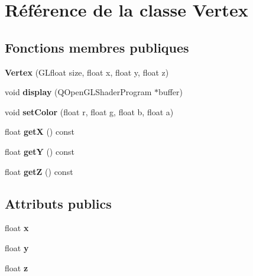 \hypertarget{classVertex}{}\section{Référence de la classe Vertex}
\label{classVertex}
\subsection*{Fonctions membres publiques}
\begin{DoxyCompactItemize}
\item 
\mbox{\label{classVertex_abf50078add37f9aa0561aee1df7d7b61}} 
{\bfseries Vertex} (G\+Lfloat size, float x, float y, float z)
\item 
\mbox{\label{classVertex_a1952c404463115f7d5f8bc34969460b1}} 
void {\bfseries display} (Q\+Open\+G\+L\+Shader\+Program $\ast$buffer)
\item 
\mbox{\label{classVertex_a2b3a815d2398fc189b672cf20b80c315}} 
void {\bfseries set\+Color} (float r, float g, float b, float a)
\item 
\mbox{\label{classVertex_a85b810eda5388be6c25f10637912d3bb}} 
float {\bfseries getX} () const
\item 
\mbox{\label{classVertex_a0e32c2b9f10f7cc2b6f94294772927a1}} 
float {\bfseries getY} () const
\item 
\mbox{\label{classVertex_a5da490f9713243943d516535d53a271f}} 
float {\bfseries getZ} () const
\end{DoxyCompactItemize}
\subsection*{Attributs publics}
\begin{DoxyCompactItemize}
\item 
\mbox{\label{classVertex_aa592e1564aa3b226ff629b824b240310}} 
float {\bfseries x}
\item 
\mbox{\label{classVertex_a448817068556fe43e81dc0a3e7d1fa43}} 
float {\bfseries y}
\item 
\mbox{\label{classVertex_af5d14cd74cd842c01f9a8a8d92325339}} 
float {\bfseries z}
\end{DoxyCompactItemize}
